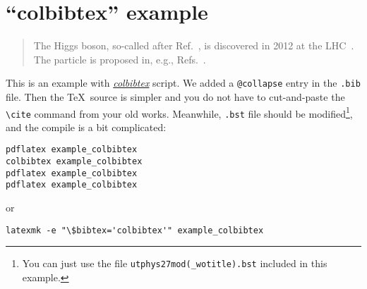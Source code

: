 \documentclass{article}
\begin{document}
\section*{``colbibtex'' example}
\begin{quote}
  The Higgs boson, so-called after Ref.~\cite{Higgs:1964pj}, is discovered in 2012 at the LHC~\cite{HiggsDiscovery}.
  The particle is proposed in, e.g., Refs.~\cite{Higgs:1964pj,Englert:1964et}.
\end{quote}

This is an example with \href{https://github.com/misho104/colbibtex}{\emph{colbibtex}} script.
We added a \texttt{@collapse} entry in the \texttt{.bib} file.
Then the \TeX\ source is simpler and you do not have to cut-and-paste the \texttt{\textbackslash cite} command from your old works.
Meanwhile, \texttt{.bst} file should be modified\footnote{%
  You can just use the file \texttt{utphys27mod(\_wotitle).bst} included in this example.
}, and the compile is a bit complicated:
\begin{lstlisting}
pdflatex example_colbibtex
colbibtex example_colbibtex
pdflatex example_colbibtex
pdflatex example_colbibtex
\end{lstlisting}
or
\begin{lstlisting}
latexmk -e "\$bibtex='colbibtex'" example_colbibtex
\end{lstlisting}


\end{document}
